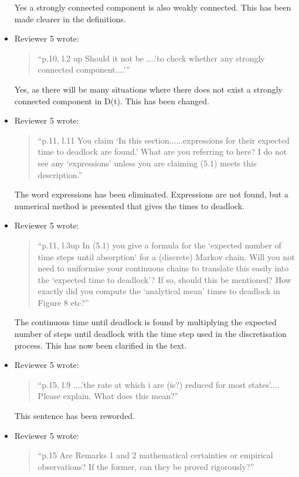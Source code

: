 \documentclass{article}
\begin{document}
\begin{itemize}
Yes a strongly connected component is also weakly connected. This has been made
clearer in the definitions.


\item Reviewer 5 wrote:
\begin{quote}
``p.10, l.2 up Should it not be ....’to check whether any strongly connected
component....’''
\end{quote}

Yes, as there will be many situations where there does not exist a strongly
connected component in D(t). This has been changed.


\item Reviewer 5 wrote:
\begin{quote}
``p.11, l.11 You claim ‘In this section......expressions for their expected time
to deadlock are found.’ What are you referring to here? I do not see any
‘expressions’ unless you are claiming (5.1) meets this description.''
\end{quote}

The word expressions has been eliminated. Expressions are not found, but a
numerical method is presented that gives the times to deadlock.


\item Reviewer 5 wrote:
\begin{quote}
``p.11, l.3up In (5.1) you give a formula for the ‘expected number of time steps
until absorption’ for a (discrete) Markov chain. Will you not need to uniformise
your continuous chains to translate this easily into the ‘expected time to
deadlock’? If so, should this be mentioned? How exactly did you compute the
‘analytical mean’ times to deadlock in Figure 8 etc?''
\end{quote}

The continuous time until deadlock is found by multiplying the expected number
of steps until deadlock with the time step used in the discretisation process.
This has now been clarified in the text.

\item Reviewer 5 wrote:
\begin{quote}
``p.15, l.9 ....’the rate at which i are (is?) reduced for most states’....
Please explain. What does this mean?''
\end{quote}

This sentence has been reworded.


\item Reviewer 5 wrote:
\begin{quote}
``p.15 Are Remarks 1 and 2 mathematical certainties or empirical observations?
If the former, can they be proved rigorously?''
\end{quote}


\end{itemize}
\end{document}
